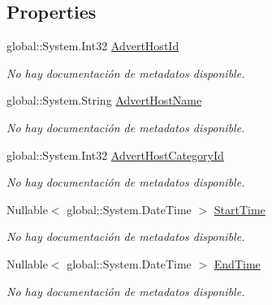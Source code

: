 \subsection*{Properties}
\begin{DoxyCompactItemize}
\item 
global\-::\-System.\-Int32 \hyperlink{class_game_memory_1_1_advert_hosts_a050c3c580d2c90577cabff79c565fdbc}{Advert\-Host\-Id}
\begin{DoxyCompactList}\small\item\em No hay documentación de metadatos disponible. \end{DoxyCompactList}\item 
global\-::\-System.\-String \hyperlink{class_game_memory_1_1_advert_hosts_a5738204678324f4adb8a9b54c1331a08}{Advert\-Host\-Name}
\begin{DoxyCompactList}\small\item\em No hay documentación de metadatos disponible. \end{DoxyCompactList}\item 
global\-::\-System.\-Int32 \hyperlink{class_game_memory_1_1_advert_hosts_adb9878a533fd009839d66c95d514e075}{Advert\-Host\-Category\-Id}
\begin{DoxyCompactList}\small\item\em No hay documentación de metadatos disponible. \end{DoxyCompactList}\item 
Nullable$<$ global\-::\-System.\-Date\-Time $>$ \hyperlink{class_game_memory_1_1_advert_hosts_a01dfdd5bd9e5b5970ae3e2768f33e6d6}{Start\-Time}
\begin{DoxyCompactList}\small\item\em No hay documentación de metadatos disponible. \end{DoxyCompactList}\item 
Nullable$<$ global\-::\-System.\-Date\-Time $>$ \hyperlink{class_game_memory_1_1_advert_hosts_a565c137468bd134b1fa5c32a9f32f9c0}{End\-Time}
\begin{DoxyCompactList}\small\item\em No hay documentación de metadatos disponible. \end{DoxyCompactList}\item 

\end{DoxyCompactItemize}

